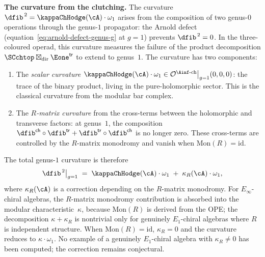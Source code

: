 \begin{construction}
\medskip\noindent
\textbf{The curvature from the clutching.}
The curvature $\dfib^{\,2} = \kappaChHodge(\cA) \cdot \omega_1$
arises from the composition of two genus-$0$ operations
through the genus-$1$ propagator: the Arnold defect
(equation~\eqref{eq:arnold-defect-genus-g} at $g=1$)
prevents $\dfib^{\,2}=0$.
In the three-coloured operad, this curvature measures
the failure of the product decomposition
$\SCchtop\boxtimes_{\mathrm{dir}}\Eone^{\mathsf{tr}}$ to extend to
genus~$1$. The curvature has two components:
\begin{enumerate}[label=\textup{(\alph*)}]
\item The \emph{scalar curvature}
 $\kappaChHodge(\cA) \cdot \omega_1 \in
 \mathcal{O}^{\Ainf\text{-ch}}\big|_{g=1}(0,0,0)$:
 the trace of the binary product, living in the
 pure-holomorphic sector. This is the classical
 curvature from the modular bar complex.
\item The \emph{$R$-matrix curvature} from the cross-terms
 between the holomorphic and transverse factors:
 at genus~$1$, the composition
 $\dfib^{\mathsf{ch}} \circ \dfib^{\mathsf{tr}}
 + \dfib^{\mathsf{tr}} \circ \dfib^{\mathsf{ch}}$
 is no longer zero. These cross-terms are controlled
 by the $R$-matrix monodromy and vanish when
 $\mathrm{Mon}(R) = \mathrm{id}$.
\end{enumerate}
The total genus-$1$ curvature is therefore
\[
 \dfib^{\,2}\big|_{g=1}
 \;=\;
 \kappaChHodge(\cA) \cdot \omega_1
 \;+\;
 \kappa_R(\cA) \cdot \omega_1,
\]
where $\kappa_R(\cA)$ is a correction depending on
the $R$-matrix monodromy.
For $E_\infty$-chiral algebras, the $R$-matrix monodromy
contribution is absorbed into the modular
characteristic~$\kappa$, because $\mathrm{Mon}(R)$ is
derived from the OPE; the decomposition
$\kappa + \kappa_R$ is nontrivial only for genuinely
$E_1$-chiral algebras where $R$ is independent structure.
When $\mathrm{Mon}(R)=\mathrm{id}$,
$\kappa_R = 0$ and the curvature reduces to
$\kappa \cdot \omega_1$.
No example of a genuinely $E_1$-chiral algebra with
$\kappa_R \neq 0$ has been computed; the correction
remains conjectural.
\end{construction}


